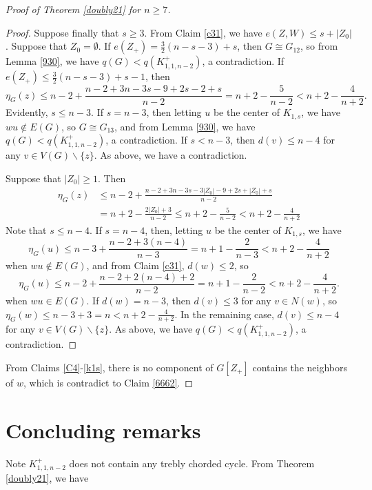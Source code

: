 \documentclass[12pt]{article}
\begin{document}
\begin{proof}[Proof of Theorem \ref{doubly21} for $n\ge 7$]
\begin{proof}
Suppose finally that $s\ge 3$.
From Claim \ref{c31}, we have $e(Z,W)\le s+|Z_0|$.
Suppose that $Z_0=\emptyset$.  If $e(Z_+)=\frac{3}{2}\left(n-s-3\right)+s$, then $G\cong G_{12}$, so
from  Lemma \ref{930}, we have $q(G)<q(K_{1,1,n-2}^+)$, a contradiction.
If $e(Z_+)\le\frac{3}{2}\left(n-s-3\right)+s-1$, then
\[
\eta_{G}(z)\le n-2+\frac{n-2+3n-3s-9+2s-2+s}{n-2}=n+2-\frac{5}{n-2}<n+2-\frac{4}{n+2}.
\]
 Evidently, $s\le n-3$.
If $s=n-3$, then letting $u$ be the center of $K_{1,s}$, we have $wu\notin E(G)$, so $G\cong G_{13}$, and from  Lemma \ref{930}, we have $q(G)<q(K_{1,1,n-2}^+)$, a contradiction. If $s<n-3$,
then  $d(v)\le n-4$ for any $v\in V(G)\backslash\{z\}$.
As above, we have a contradiction.

Suppose that $|Z_0|\ge 1$. Then
\begin{align*}
\eta_G(z)&\le n-2+\frac{n-2+3n-3s-3|Z_0|-9+2s+|Z_0|+s}{n-2}\\
&=n+2-\frac{2|Z_0|+3}{n-2}\le n+2-\frac{5}{n-2}<n+2-\frac{4}{n+2}
\end{align*}
Note that $s\le n-4$. If $s=n-4$,
then, letting $u$ be the center of $K_{1,s}$, we have
\[
\eta_G(u)\le n-3+\frac{n-2+3(n-4)}{n-3}=n+1-\frac{2}{n-3}<n+2-\frac{4}{n+2}
\]
when $wu\notin E(G)$, and from Claim \ref{c31},  $d(w)\le 2$, so
\[
\eta_G(u)\le n-2+\frac{n-2+2(n-4)+2}{n-2}=n+1-\frac{2}{n-2}<n+2-\frac{4}{n+2}.
\]
when $wu\in E(G)$.
If $d(w)=n-3$, then $d(v)\le 3$ for any $v\in N(w)$, so $\eta_G(w)\le n-3+3=n<n+2-\frac{4}{n+2}$. %
In the remaining case, 
 $d(v)\le n-4$ for any $v\in V(G)\backslash\{z\}$.
As above, we have $q(G)<q(K_{1,1,n-2}^+)$, a contradiction.
\end{proof}

From Claims \ref{C4}-\ref{k1s},
there is no component of $G[Z_+]$ contains the neighbors of $w$, which is contradict to Claim \ref{6662}.
\end{proof}








\section{Concluding remarks}

Note $K_{1,1,n-2}^+$ does not contain any trebly chorded cycle.
From Theorem \ref{doubly21}, we have
\end{document}
